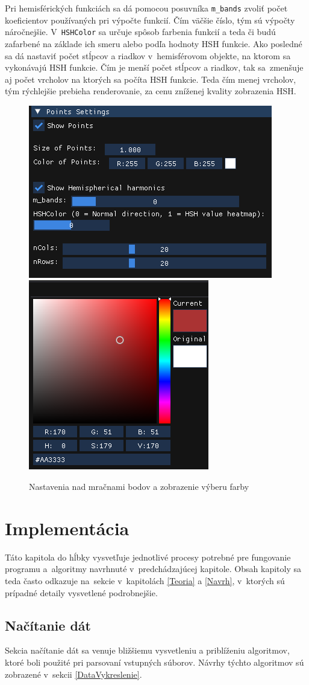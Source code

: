 Pri hemisférických funkciách sa dá pomocou posuvníka \verb|m_bands| zvoliť počet koeficientov používaných pri výpočte funkcií. Čím väčšie číslo, tým sú výpočty náročnejšie. V~\verb|HSHColor| sa určuje spôsob farbenia funkcií a teda či budú zafarbené na základe ich smeru alebo podľa hodnoty HSH funkcie. Ako posledné sa dá nastaviť počet stĺpcov a riadkov v~hemisférovom objekte, na ktorom sa vykonávajú HSH funkcie. Čím je menší počet stĺpcov a riadkov, tak sa~zmenšuje aj počet vrcholov na ktorých sa počíta HSH funkcie. Teda čím menej vrcholov, tým rýchlejšie prebieha renderovanie, za cenu zníženej kvality zobrazenia HSH.
\begin{figure}[b!] \label{PointSettings}
    \centering
    \includegraphics[width=0.475\linewidth]{obrazky-figures/UI_points.png}
    \includegraphics[width=0.32\linewidth]{obrazky-figures/UI_colorpicker.png}
    \caption{Nastavenia nad mračnami bodov a zobrazenie výberu farby}
\end{figure}

\chapter{Implementácia}
\label{Implementacia}
Táto kapitola do hĺbky vysvetľuje jednotlivé procesy potrebné pre fungovanie programu a~algoritmy navrhnuté v~predchádzajúcej kapitole. Obsah kapitoly sa teda často odkazuje na~sekcie v~kapitolách \ref{Teoria} a \ref{Navrh}, v~ktorých sú prípadné detaily vysvetlené podrobnejšie. 
\section{Načítanie dát}
Sekcia načítanie dát sa venuje bližšiemu vysvetleniu a priblíženiu algoritmov, ktoré boli použité pri parsovaní vstupných súborov. Návrhy týchto algoritmov sú zobrazené v~sekcii \ref{DataVykreslenie}.
